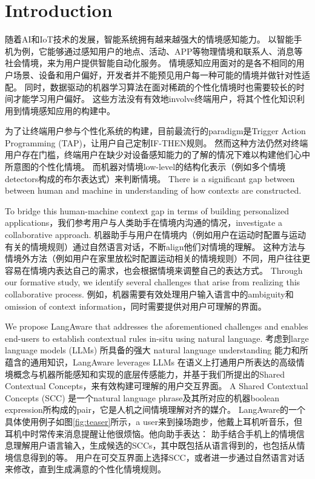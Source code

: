 

\section{Introduction}

随着AI和IoT技术的发展，智能系统拥有越来越强大的情境感知能力。
以智能手机为例，它能够通过感知用户的地点、活动、APP等物理情境和联系人、消息等社会情境，来为用户提供智能自动化服务。
情境感知应用面对的是各不相同的用户场景、设备和用户偏好，开发者并不能预见用户每一种可能的情境并做针对性适配。
同时，数据驱动的机器学习算法在面对稀疏的个性化情境时也需要较长的时间才能学习用户偏好。
这些方法没有有效地involve终端用户，将其个性化知识利用到情境感知应用的构建中。

为了让终端用户参与个性化系统的构建，目前最流行的paradigm是Trigger Action Programming (TAP)，让用户自己定制IF-THEN规则。
然而这种方法仍然对终端用户存在门槛，终端用户在缺少对设备感知能力的了解的情况下难以构建他们心中所意图的个性化情境\cite{ur_practical_2014,ur_trigger-action_2016,corno_high-level_2019}。
而机器对情境low-level的结构化表示（例如多个情境detectors构成的布尔表达式）来判断情境。
There is a significant gap between between human and machine in understanding of how contexts are constructed.

To bridge this human-machine context gap in terms of building personalized applications，我们参考用户与人类助手在情境内沟通的情况，investigate a collaborative approach.
机器助手与用户在情境内（例如用户在运动时配置与运动有关的情境规则）通过自然语言对话，不断align他们对情境的理解。
这种方法与情境外方法（例如用户在家里放松时配置运动相关的情境规则）不同，用户往往更容易在情境内表达自己的需求，也会根据情境来调整自己的表达方式。
Through our formative study, we identify several challenges that arise from realizing this collaborative process.
例如，机器需要有效处理用户输入语言中的ambiguity和omission of context information，同时需要提供对用户可理解的界面。

We propose LangAware that addresses the aforementioned challenges and enables end-users to establish contextual rules in-situ using natural language.
考虑到large language models (LLMs) 所具备的强大 natural language understanding 能力和所蕴含的通用知识，LangAware leverages LLMs 在语义上打通用户所表达的高级情境概念与机器所能感知和实现的底层传感能力，并基于我们所提出的Shared Contextual Concepts，来有效构建可理解的用户交互界面。
A Shared Contextual Concepts (SCC) 是一个natural language phrase及其所对应的机器boolean expression所构成的pair，它是人机之间情境理解对齐的媒介。
LangAware的一个具体使用例子如图\ref{fig:teaser}所示，a user来到操场跑步，他戴上耳机听音乐，但耳机中时常传来消息提醒让他很烦恼。他向助手表达： 助手结合手机上的情境信息理解用户语言输入，生成候选的SCCs，其中既包括从语言得到的，也包括从情境信息得到的等。
用户在可交互界面上选择SCC，或者进一步通过自然语言对话来修改，直到生成满意的个性化情境规则。

